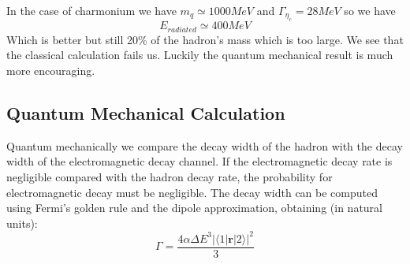 \documentclass[11pt,a4paper]{article}
\begin{document}
In the case of charmonium we have $m_q\simeq 1000 MeV$ and $\Gamma_{\eta_c}=28 MeV$ so we have
\begin{equation}
E_{radiated}\simeq 400 MeV
\end{equation}
Which is better but still 20\% of the hadron's mass which is too large.
We see that the classical calculation fails us. Luckily the quantum mechanical result is much more encouraging.

\subsection{Quantum Mechanical Calculation}

Quantum mechanically we compare the decay width of the hadron with the decay width of the electromagnetic decay channel. If the electromagnetic decay rate is negligible compared with the hadron decay rate, the probability for electromagnetic decay must be negligible. The decay width can be computed using Fermi's golden rule and the dipole approximation, obtaining (in natural units):\cite{Scully97}
\begin{equation}
\Gamma=\frac{4\alpha\Delta E^3\vert\langle 1\vert \textbf{r} \vert 2\rangle\vert^2}{3}
\end{equation}
\end{document}
